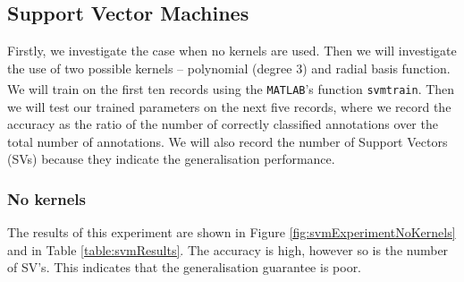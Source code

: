 \subsection{Support Vector Machines}
Firstly, we investigate the case when no kernels are used. Then we will investigate the use of two possible kernels -- polynomial (degree 3) and radial basis function. We will train on the first ten records using the \verb!MATLAB!\textsuperscript{\textregistered}'s function \verb!svmtrain!. Then we will test our trained parameters on the next five records, where we record the accuracy as the ratio of the number of correctly classified annotations over the total number of annotations. We will also record the number of Support Vectors (SVs) because they indicate the generalisation performance.

\subsubsection{No kernels}
The results of this experiment are shown in Figure \ref{fig:svmExperimentNoKernels} and in Table \ref{table:svmResults}. The accuracy is high, however so is the number of SV's. This indicates that the generalisation guarantee is poor.
